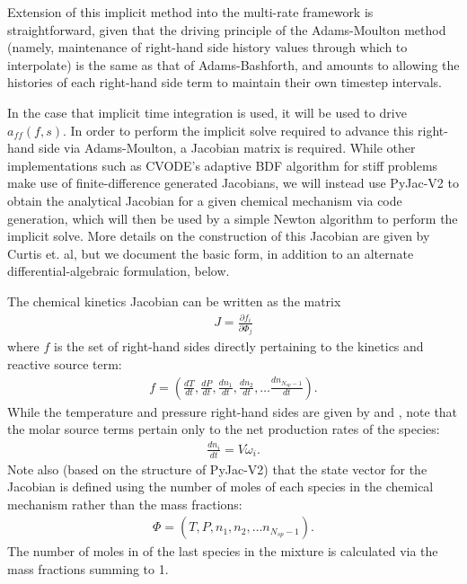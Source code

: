 Extension of this implicit method into the multi-rate framework is
straightforward, given that the driving principle of the Adams-Moulton
method (namely, maintenance of right-hand side history values through
which to interpolate) is the same as that of Adams-Bashforth, and amounts to
allowing the histories of each right-hand side term to maintain their
own timestep intervals.

In the case that implicit time integration is used, it will be used
to drive $a_{ff}(f,s)$. In order to perform the implicit solve required
to advance this right-hand side via Adams-Moulton, a Jacobian matrix
is required. While other implementations such as CVODE's adaptive BDF
algorithm for stiff problems make use of finite-difference generated
Jacobians, we will instead use PyJac-V2 \cite{curtis2018using} to obtain the analytical Jacobian
for a given chemical mechanism via code generation, which will then
be used by a simple Newton algorithm to perform the implicit solve. More
details on the construction of this Jacobian are given by Curtis et. al, but we
document the basic form, in addition to an alternate differential-algebraic
formulation, below.

The chemical kinetics Jacobian can be written as the matrix
\begin{align}
J = \frac{\partial f_{i}}{\partial \Phi_{j}} \label{eq:jac}
\end{align}
where $f$ is the set of right-hand sides directly pertaining
to the kinetics and reactive source term:
\begin{align}
f = \left(\frac{dT}{dt}, \frac{dP}{dt}, \frac{dn_{1}}{dt}, \frac{dn_{2}}{dt}, \hdots \frac{dn_{N_{sp}-1}}{dt} \right).
\end{align}
While the temperature and pressure right-hand sides are given by  and ,
note that the molar source terms pertain only to the net production rates of the species:
\begin{align}
\frac{dn_{i}}{dt} = V \dot{\omega}_{i}.
\end{align}
Note also (based on the structure of PyJac-V2) that the state vector for the
Jacobian is defined using the number of moles of each species in the chemical
mechanism rather than the mass fractions:
\begin{align}
\Phi = \left(T, P, n_{1}, n_{2}, \hdots n_{N_{sp}-1}\right).
\end{align}
The number of moles in of the last species in the mixture is calculated
via the mass fractions summing to 1.

